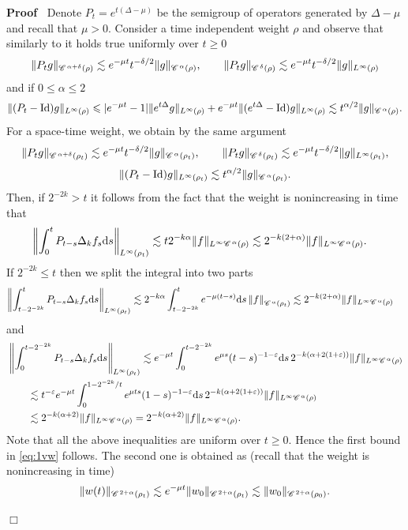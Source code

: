 \documentclass[a4paper,11pt]{article}
\renewcommand{\leq}{\leqslant}
\renewcommand{\geq}{\geqslant}
\newenvironment{proof}{\noindent\textbf{Proof\ }}{\hspace*{\fill}$\Box$\medskip}
\numberwithin{equation}{section}
\newcommand{\CC}{\mathscr{C} \hspace{.1em}}
\newcommand{\8}{\infty}
\newcommand{\dd}{\mathrm{d}}
\begin{document}
\begin{proof}
Denote $P_{t}=e^{t(\Delta-\mu)}$ be the semigroup of operators generated by $\Delta-\mu$ and recall that  $\mu>0$. Consider a time independent weight $\rho$ and  observe that similarly to \cite[Lemma A.7, Lemma A.8]{GIP} it holds true  uniformly over $t\geq 0$
\begin{align*}
\|P_{t}g\|_{\CC^{\alpha+\delta}(\rho)}\lesssim e^{-\mu t}t^{-\delta/2}\|g\|_{\CC^{\alpha}(\rho)},\qquad \|P_{t}g\|_{\CC^{\delta}(\rho)}\lesssim e^{-\mu t} t^{-\delta/2}\|g\|_{L^{\8}(\rho)}
\end{align*}
and if $0\leq\alpha \leqslant 2$
$$
\|(P_{t}-\mathrm{Id})g\|_{L^{\8}(\rho)}\leqslant |e^{-\mu t}-1|\|e^{t\Delta}g \|_{L^{\8}(\rho)}+e^{-\mu t}\|(e^{t\Delta}-\mathrm{Id})g \|_{L^{\8}(\rho)} \lesssim t^{\alpha/2}\|g\|_{\CC^{\alpha}(\rho)}.
$$
For a space-time weight, we obtain by the same  argument 
\begin{align}\label{eq:sch10}
\|P_{t}g\|_{\CC^{\alpha+\delta}(\rho_{t})}\lesssim e^{-\mu t}t^{-\delta/2}\|g\|_{\CC^{\alpha}(\rho_{t})},\qquad \|P_{t}g\|_{\CC^{\delta}(\rho_{t})}\lesssim e^{-\mu t} t^{-\delta/2}\|g\|_{L^{\8}(\rho_{t})},
\end{align}
$$
\|(P_{t}-\mathrm{Id})g\|_{L^{\8}(\rho_{t})} \lesssim t^{\alpha/2}\|g\|_{\CC^{\alpha}(\rho_{t})}.
$$
Then, if $2^{-2k}>t$  it follows from the fact that the weight is nonincreasing in time that
\begin{align*}
\left\|\int_{0}^{t}P_{t-s}\Delta_{k}f_{s}\mathrm{d}s\right\|_{L^{\infty}(\rho_{t})}&\lesssim t 2^{-k\alpha}\|f\|_{L^{\infty}\CC^{\alpha}(\rho)}\lesssim 2^{-k(2+\alpha)}\|f\|_{L^{\infty}\CC^{\alpha}(\rho)}.
\end{align*}
If $2^{-2k}\leqslant t$ then we split the integral into two parts
\begin{align*}
\left\|\int_{t-2^{-2k}}^{t}P_{t-s}\Delta_{k}f_{s}\mathrm{d}s\right\|_{L^{\infty}(\rho_{t})}&\lesssim 2^{-k\alpha}\int_{t-2^{-2k}}^{t}e^{-\mu(t-s)}\mathrm{d}s \left\|f\right\|_{\CC^{\alpha}(\rho_{t})}\lesssim 2^{-k(2+\alpha)}\|f\|_{L^{\infty}\CC^{\alpha}(\rho)}
\end{align*}
and
\begin{align*}
&\left\|\int_{0}^{t-2^{-2k}}P_{t-s}\Delta_{k}f_{s}\mathrm{d}s\right\|_{L^{\infty}(\rho_{t})}\lesssim e^{-\mu t} \int_{0}^{t-2^{-2k}}e^{\mu s} (t-s)^{-1-\varepsilon}\dd s \, 2^{-k(\alpha+2(1+\varepsilon))}\|f\|_{L^{\infty}\CC^{\alpha}(\rho)}\\
&\qquad\lesssim t^{-\varepsilon}e^{-\mu t} \int_{0}^{1-2^{-2k}/t}e^{\mu ts} (1-s)^{-1-\varepsilon}\dd s \, 2^{-k(\alpha+2(1+\varepsilon))}\|f\|_{L^{\infty}\CC^{\alpha}(\rho)}\\
&\qquad\lesssim 2^{-k(\alpha+2)}\|f\|_{L^{\infty}\CC^{\alpha}(\rho)}= 2^{-k(\alpha+2)}\|f\|_{L^{\infty}\CC^{\alpha}(\rho)}.
\end{align*}
Note that all the above inequalities are uniform over $t\geq 0$. Hence the first bound in \eqref{eq:1vw} follows. The second one is obtained as (recall that the weight is nonincreasing in time)
$$
\|w(t)\|_{\CC^{2+\alpha}(\rho_{t})}\lesssim e^{-\mu t}\|w_{0}\|_{\CC^{2+\alpha}(\rho_{t})} \lesssim \|w_{0}\|_{\CC^{2+\alpha}(\rho_{0})}.
$$


\end{proof}
\end{document}
